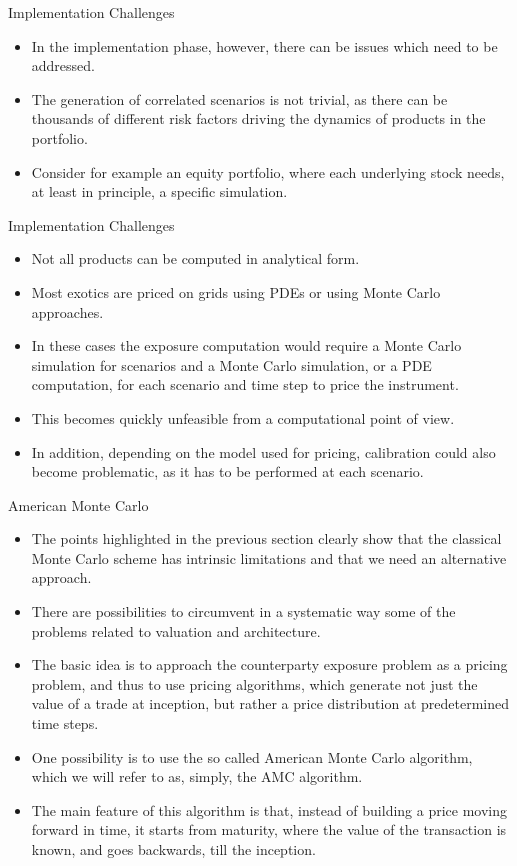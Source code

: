 \documentclass[11pt]{beamer}
\begin{document}
\begin{frame}{Implementation Challenges}
\begin{itemize}
\item In the implementation phase, however, there can be issues which need to be addressed.
\item The generation of correlated scenarios is not trivial, as there can be thousands
of different risk factors driving the dynamics of products in the portfolio. 
\item Consider
for example an equity portfolio, where each underlying stock needs, at
least in principle, a specific simulation.
\end{itemize}
\end{frame}
\begin{frame}{Implementation Challenges}
\begin{itemize}
\item Not all products can be computed in analytical form. 
\item Most exotics are priced
on grids using PDEs or using Monte Carlo approaches.
\item In these cases the exposure
computation would require a Monte Carlo simulation for scenarios and
a Monte Carlo simulation, or a PDE computation, for each scenario and time
step to price the instrument. 
\item This becomes quickly unfeasible from a computational
point of view. 
\item In addition, depending on the model used for pricing,
calibration could also become problematic, as it has to be performed at each
scenario.
\end{itemize}
\end{frame}
\begin{frame}{American Monte Carlo}
\begin{itemize}
\item The points highlighted in the previous section clearly show that the classical Monte
Carlo scheme has intrinsic limitations and that we need an alternative approach. 
\item There are possibilities to circumvent in
a systematic way some of the problems related to valuation and architecture.
\item The basic idea is to approach the counterparty exposure problem as a pricing
problem, and thus to use pricing algorithms, which generate not just the value of a
trade at inception, but rather a price distribution at predetermined time steps. 
\item One
possibility is to use the so called American Monte Carlo algorithm, which we will
refer to as, simply, the AMC algorithm.
\item  The main feature of this algorithm is that,
instead of building a price moving forward in time, it starts from maturity, where
the value of the transaction is known, and goes backwards, till the inception.
\end{itemize}
\end{frame}
\end{document}
